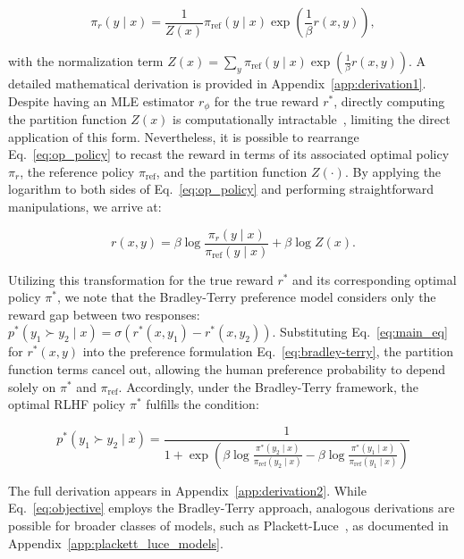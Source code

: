 \begin{equation}\label{eq:op_policy}
    \pi_r(y\mid x) = \frac{1}{Z(x)}\pi_\text{ref}(y\mid x)\exp\left(\frac{1}{\beta}r(x, y)\right),
\end{equation}

with the normalization term $Z(x) =\sum_{y}\pi_\text{ref}(y\mid x)\exp\left(\frac{1}{\beta}r(x, y)\right)$. A detailed mathematical derivation is provided in Appendix~\ref{app:derivation1}. Despite having an MLE estimator $r_{\phi}$ for the true reward $r^*$, directly computing the partition function $Z(x)$ is computationally intractable~\citep{korbak2022reinforcement, go2023aligning}, limiting the direct application of this form. Nevertheless, it is possible to rearrange Eq.~\ref{eq:op_policy} to recast the reward in terms of its associated optimal policy $\pi_r$, the reference policy $\pi_\text{ref}$, and the partition function $Z(\cdot)$. By applying the logarithm to both sides of Eq.~\ref{eq:op_policy} and performing straightforward manipulations, we arrive at:

\begin{equation}\label{eq:main_eq}
    r(x,y) =\beta \log \frac{\pi_r(y\mid x)}{\pi_\text{ref}(y\mid x)} + \beta \log Z(x).
\end{equation}

Utilizing this transformation for the true reward $r^*$ and its corresponding optimal policy $\pi^*$, we note that the Bradley-Terry preference model considers only the reward gap between two responses: ${p^*(y_1 \succ y_2 \mid x) = \sigma(r^*(x, y_1) - r^*(x, y_2))}$. Substituting Eq.~\ref{eq:main_eq} for $r^*(x, y)$ into the preference formulation Eq.~\ref{eq:bradley-terry}, the partition function terms cancel out, allowing the human preference probability to depend solely on $\pi^*$ and $\pi_\text{ref}$. Accordingly, under the Bradley-Terry framework, the optimal RLHF policy $\pi^*$ fulfills the condition:

\begin{equation}\label{eq:objective}
    p^*(y_1\succ y_2 \mid x)=\frac{1}{1 + \exp\left(\beta \log \frac{\pi^*(y_2\mid x)}{\pi_\text{ref}(y_2\mid x)} - \beta \log \frac{\pi^*(y_1\mid x)}{\pi_\text{ref}(y_1\mid x)}\right)}
\end{equation}

The full derivation appears in Appendix~\ref{app:derivation2}. While Eq.~\ref{eq:objective} employs the Bradley-Terry approach, analogous derivations are possible for broader classes of models, such as Plackett-Luce~\citep{plackett1975analysis, luce2012individual}, as documented in Appendix~\ref{app:plackett_luce_models}.

